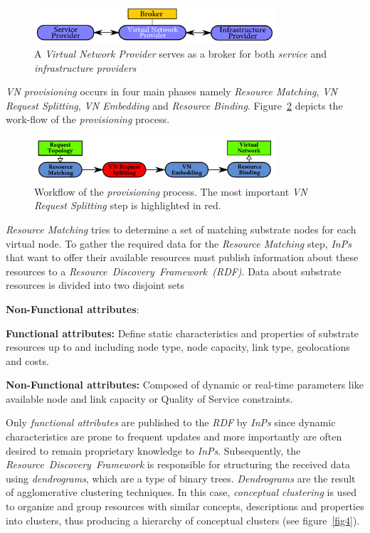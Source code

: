 \documentclass[prodmode,acmtomccap]{acmlarge}
\begin{document}
\begin{figure}[htb]
	\centering
	\includegraphics[width=0.8\textwidth]{broker}
	\caption{A \emph{Virtual Network Provider} serves as a broker for  both \emph{service} and \emph{infrastructure providers}}
	\label{fig2}
\end{figure}

\emph{VN provisioning} occurs in four main phases namely \emph{Resource Matching}, \emph{VN Request Splitting}, \emph{VN Embedding} and \emph{Resource Binding}.
Figure~\ref{fig3} depicts the work-flow of the \emph{provisioning} process.

\begin{figure}[htb]
	\centering
	\includegraphics[width=0.8\textwidth]{provisioning2}
	\caption{Workflow of the \emph{provisioning} process. The most important \emph{VN Request Splitting} step is highlighted in red.}
	\label{fig3}
\end{figure}

\emph{Resource Matching} tries to determine a set of matching substrate nodes for each virtual node.
To gather the required data for the  \emph{Resource Matching} step, \emph{InPs} that want to offer their available resources must publish information about these resources
to a \emph{Resource~Discovery~Framework~(RDF)}. Data about substrate resources is divided into two disjoint sets

\begin{describe}{{\bfseries Non-Functional attributes\/}:}
	\item[\bfseries Functional attributes:] Define static characteristics and properties of substrate resources up to and including node type, node capacity, link type, geolocations and costs.
	\item[\bfseries Non-Functional attributes:] Composed of dynamic or real-time parameters like available node and link capacity or Quality of Service constraints.
\end{describe}

Only \emph{functional attributes} are published to the \emph{RDF} by \emph{InPs} since dynamic characteristics are prone to frequent updates and more importantly
are often desired to remain proprietary knowledge to \emph{InPs}. Subsequently, the \emph{Resource~Discovery~Framework} is responsible for structuring the received data
using \emph{dendrograms}, which are a type of binary trees. \emph{Dendrograms} are the result of agglomerative clustering techniques. In this case, \emph{conceptual clustering}
is used to organize and group resources with similar concepts, descriptions and properties into clusters, thus producing a hierarchy of conceptual clusters (see figure~\ref{fig4}).
\end{document}
